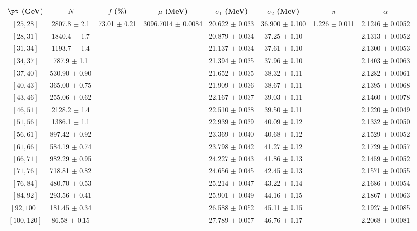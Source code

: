 \begin{tabular}{c||c|c|c|c|c|c|c}
$\pt$ (GeV) & $N$ & $f$ (\%) & $\mu$ (MeV) & $\sigma_1$ (MeV) & $\sigma_2$ (MeV) & $n$ & $\alpha$ \\
\hline
$[25, 28]$ & 2807.8 $\pm$ 2.1 & \multirow{17}{*}{73.01 $\pm$ 0.21} & \multirow{17}{*}{3096.7014 $\pm$ 0.0084} & 20.622 $\pm$ 0.033 & 36.900 $\pm$ 0.100 & \multirow{17}{*}{1.226 $\pm$ 0.011} & 2.1246 $\pm$ 0.0052\\
$[28, 31]$ & 1840.4 $\pm$ 1.7 &  &  & 20.879 $\pm$ 0.034 & 37.25 $\pm$ 0.10 &  & 2.1313 $\pm$ 0.0052\\
$[31, 34]$ & 1193.7 $\pm$ 1.4 &  &  & 21.137 $\pm$ 0.034 & 37.61 $\pm$ 0.10 &  & 2.1300 $\pm$ 0.0053\\
$[34, 37]$ & 787.9 $\pm$ 1.1 &  &  & 21.394 $\pm$ 0.035 & 37.96 $\pm$ 0.10 &  & 2.1403 $\pm$ 0.0063\\
$[37, 40]$ & 530.90 $\pm$ 0.90 &  &  & 21.652 $\pm$ 0.035 & 38.32 $\pm$ 0.11 &  & 2.1282 $\pm$ 0.0061\\
$[40, 43]$ & 365.00 $\pm$ 0.75 &  &  & 21.909 $\pm$ 0.036 & 38.67 $\pm$ 0.11 &  & 2.1395 $\pm$ 0.0068\\
$[43, 46]$ & 255.06 $\pm$ 0.62 &  &  & 22.167 $\pm$ 0.037 & 39.03 $\pm$ 0.11 &  & 2.1460 $\pm$ 0.0078\\
$[46, 51]$ & 2128.2 $\pm$ 1.4 &  &  & 22.510 $\pm$ 0.038 & 39.50 $\pm$ 0.11 &  & 2.1220 $\pm$ 0.0049\\
$[51, 56]$ & 1386.1 $\pm$ 1.1 &  &  & 22.939 $\pm$ 0.039 & 40.09 $\pm$ 0.12 &  & 2.1332 $\pm$ 0.0050\\
$[56, 61]$ & 897.42 $\pm$ 0.92 &  &  & 23.369 $\pm$ 0.040 & 40.68 $\pm$ 0.12 &  & 2.1529 $\pm$ 0.0052\\
$[61, 66]$ & 584.19 $\pm$ 0.74 &  &  & 23.798 $\pm$ 0.042 & 41.27 $\pm$ 0.12 &  & 2.1729 $\pm$ 0.0057\\
$[66, 71]$ & 982.29 $\pm$ 0.95 &  &  & 24.227 $\pm$ 0.043 & 41.86 $\pm$ 0.13 &  & 2.1459 $\pm$ 0.0052\\
$[71, 76]$ & 718.81 $\pm$ 0.82 &  &  & 24.656 $\pm$ 0.045 & 42.45 $\pm$ 0.13 &  & 2.1571 $\pm$ 0.0055\\
$[76, 84]$ & 480.70 $\pm$ 0.53 &  &  & 25.214 $\pm$ 0.047 & 43.22 $\pm$ 0.14 &  & 2.1686 $\pm$ 0.0054\\
$[84, 92]$ & 293.56 $\pm$ 0.41 &  &  & 25.901 $\pm$ 0.049 & 44.16 $\pm$ 0.15 &  & 2.1867 $\pm$ 0.0063\\
$[92, 100]$ & 181.45 $\pm$ 0.34 &  &  & 26.588 $\pm$ 0.052 & 45.11 $\pm$ 0.15 &  & 2.1927 $\pm$ 0.0085\\
$[100, 120]$ & 86.58 $\pm$ 0.15 &  &  & 27.789 $\pm$ 0.057 & 46.76 $\pm$ 0.17 &  & 2.2068 $\pm$ 0.0081\\
\end{tabular}
